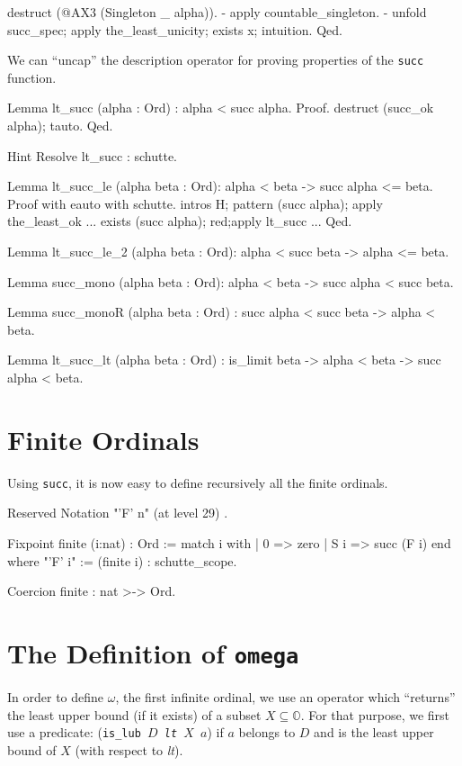 {\begin{Coqsrc}
  destruct (@AX3 (Singleton _ alpha)).
  - apply countable_singleton.
  -  unfold succ_spec; apply the_least_unicity;  exists x; intuition.
Qed.     
\end{Coqsrc}


We can ``uncap'' the description operator for proving properties of the
\texttt{succ} function.

\begin{Coqsrc}
Lemma lt_succ (alpha : Ord) :  alpha < succ alpha.
Proof.
  destruct  (succ_ok  alpha);  tauto.
Qed.

Hint Resolve lt_succ : schutte.

Lemma lt_succ_le (alpha beta : Ord):
  alpha < beta -> succ alpha <= beta.
Proof with eauto with schutte.
  intros  H;  pattern (succ alpha); apply the_least_ok ... 
  exists (succ alpha); red;apply lt_succ ...
Qed.
\end{Coqsrc}


\begin{Coqsrc}
Lemma lt_succ_le_2 (alpha beta : Ord):
  alpha < succ beta -> alpha <= beta.

Lemma succ_mono (alpha beta : Ord):
  alpha < beta -> succ alpha < succ beta.

Lemma succ_monoR (alpha beta : Ord) :
 succ alpha < succ beta -> alpha < beta.

Lemma lt_succ_lt (alpha beta : Ord) :
  is_limit beta ->  alpha < beta -> succ alpha < beta.
\end{Coqsrc}

\section{Finite Ordinals}

Using \texttt{succ}, it is now easy to define recursively all the finite ordinals.

\label{sect:notation-F-sch}

\begin{Coqsrc}
Reserved Notation "'F' n" (at level 29) .

Fixpoint finite (i:nat) : Ord :=
  match i with 
            | 0 => zero
            | S i => succ (F i)
  end
where "'F' i" := (finite i)  : schutte_scope.

Coercion finite : nat >-> Ord.
\end{Coqsrc}

\section{The Definition of \texttt{omega}}
In order to define $\omega$, the first infinite ordinal, we use an operator which
``returns'' the least upper bound (if it exists) of a subset $X\subseteq \mathbb{O}$.
For that purpose, we first use a predicate:
(\texttt{is\_lub $D$ \textit{lt} $X$ $a$}) if $a$ belongs to $D$ and is the least 
upper bound  of $X$ (with respect to \textit{lt}).


}
